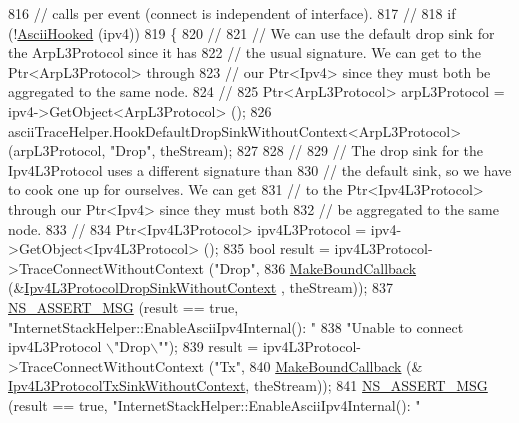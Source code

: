 \begin{DoxyCode}
816       \textcolor{comment}{// calls per event (connect is independent of interface).}
817       \textcolor{comment}{//}
818       \textcolor{keywordflow}{if} (!\hyperlink{classns3_1_1InternetStackHelper_a4b26d61d78933a884a03fbda4ec6eddc}{AsciiHooked} (ipv4))
819         \{
820           \textcolor{comment}{//}
821           \textcolor{comment}{// We can use the default drop sink for the ArpL3Protocol since it has}
822           \textcolor{comment}{// the usual signature.  We can get to the Ptr<ArpL3Protocol> through}
823           \textcolor{comment}{// our Ptr<Ipv4> since they must both be aggregated to the same node.}
824           \textcolor{comment}{//}
825           Ptr<ArpL3Protocol> arpL3Protocol = ipv4->GetObject<ArpL3Protocol> ();
826           asciiTraceHelper.HookDefaultDropSinkWithoutContext<ArpL3Protocol> (arpL3Protocol, \textcolor{stringliteral}{"Drop"}, 
      theStream);
827 
828           \textcolor{comment}{//}
829           \textcolor{comment}{// The drop sink for the Ipv4L3Protocol uses a different signature than}
830           \textcolor{comment}{// the default sink, so we have to cook one up for ourselves.  We can get}
831           \textcolor{comment}{// to the Ptr<Ipv4L3Protocol> through our Ptr<Ipv4> since they must both }
832           \textcolor{comment}{// be aggregated to the same node.}
833           \textcolor{comment}{//}
834           Ptr<Ipv4L3Protocol> ipv4L3Protocol = ipv4->GetObject<Ipv4L3Protocol> ();
835           \textcolor{keywordtype}{bool} result = ipv4L3Protocol->TraceConnectWithoutContext (\textcolor{stringliteral}{"Drop"},
836                                                                     
      \hyperlink{group__makeboundcallback_ga1725d6362e6065faa0709f7c93f8d770}{MakeBoundCallback} (&\hyperlink{namespacens3_aa6faccffe4e7ec3e0a1f5ea80ed7f81d}{Ipv4L3ProtocolDropSinkWithoutContext}
      , theStream));
837           \hyperlink{assert_8h_aff5ece9066c74e681e74999856f08539}{NS\_ASSERT\_MSG} (result == \textcolor{keyword}{true}, \textcolor{stringliteral}{"InternetStackHelper::EnableAsciiIpv4Internal():  "}
838                          \textcolor{stringliteral}{"Unable to connect ipv4L3Protocol \(\backslash\)"Drop\(\backslash\)""});
839           result = ipv4L3Protocol->TraceConnectWithoutContext (\textcolor{stringliteral}{"Tx"}, 
840                                                                \hyperlink{group__makeboundcallback_ga1725d6362e6065faa0709f7c93f8d770}{MakeBoundCallback} (&
      \hyperlink{namespacens3_ae08dabf17f5254377bcce237263a3c4d}{Ipv4L3ProtocolTxSinkWithoutContext}, theStream));
841           \hyperlink{assert_8h_aff5ece9066c74e681e74999856f08539}{NS\_ASSERT\_MSG} (result == \textcolor{keyword}{true}, \textcolor{stringliteral}{"InternetStackHelper::EnableAsciiIpv4Internal():  "}

\end{DoxyCode}
